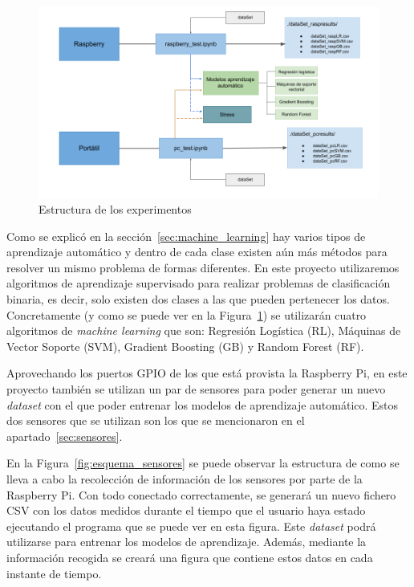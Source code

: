\documentclass[a4paper, 12pt]{book}
\begin{document}
\begin{figure}[htb]
  \centering
  \includegraphics[width=15cm, keepaspectratio]{img/arquitectura_general.png}
  \caption{Estructura de los experimentos}\label{fig:arquitectura}
\end{figure}

Como se explicó en la sección~\ref{sec:machine_learning} hay varios tipos de aprendizaje automático y dentro de cada clase existen aún más métodos para resolver un mismo problema de formas diferentes. En este proyecto utilizaremos algoritmos de aprendizaje supervisado para realizar problemas de clasificación binaria, es decir, solo existen dos clases a las que pueden pertenecer los datos. Concretamente (y como se puede ver en la Figura~\ref{fig:arquitectura}) se utilizarán cuatro algoritmos de \textit{machine learning} que son: Regresión Logística (RL), Máquinas de Vector Soporte (SVM), Gradient Boosting (GB) y Random Forest (RF).

Aprovechando los puertos GPIO de los que está provista la Raspberry Pi, en este proyecto también se utilizan un par de sensores para poder generar un nuevo \textit{dataset} con el que poder entrenar los modelos de aprendizaje automático. Estos dos sensores que se utilizan son los que se mencionaron en el apartado~\ref{sec:sensores}.

En la Figura~\ref{fig:esquema_sensores} se puede observar la estructura de como se lleva a cabo la recolección de información de los sensores por parte de la Raspberry Pi. Con todo conectado correctamente, se generará un nuevo fichero CSV con los datos medidos durante el tiempo que el usuario haya estado ejecutando el programa que se puede ver en esta figura. Este \textit{dataset} podrá utilizarse para entrenar los modelos de aprendizaje. Además, mediante la información recogida se creará una figura que contiene estos datos en cada instante de tiempo.
\end{document}
